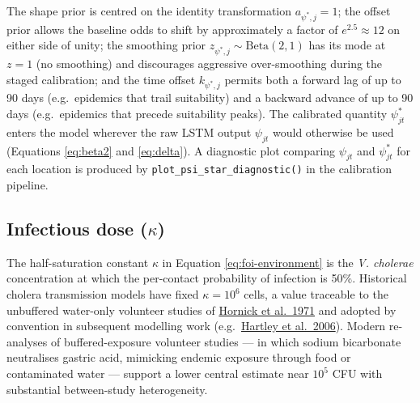 \documentclass[
]{book}
\begin{document}
The shape prior is centred on the identity transformation \(a_{\psi^{\ast},j} = 1\); the offset prior allows the baseline odds to shift by approximately a factor of \(e^{2.5} \approx 12\) on either side of unity; the smoothing prior \(z_{\psi^{\ast},j} \sim \text{Beta}(2, 1)\) has its mode at \(z = 1\) (no smoothing) and discourages aggressive over-smoothing during the staged calibration; and the time offset \(k_{\psi^{\ast},j}\) permits both a forward lag of up to 90 days (e.g.~epidemics that trail suitability) and a backward advance of up to 90 days (e.g.~epidemics that precede suitability peaks). The calibrated quantity \(\psi^{\ast}_{jt}\) enters the model wherever the raw LSTM output \(\psi_{jt}\) would otherwise be used (Equations \eqref{eq:beta2} and \eqref{eq:delta}). A diagnostic plot comparing \(\psi_{jt}\) and \(\psi^{\ast}_{jt}\) for each location is produced by \texttt{plot\_psi\_star\_diagnostic()} in the calibration pipeline.

\subsection{\texorpdfstring{Infectious dose (\(\kappa\))}{Infectious dose (\textbackslash kappa)}}\label{infectious-dose-kappa}

The half-saturation constant \(\kappa\) in Equation \eqref{eq:foi-environment} is the \emph{V. cholerae} concentration at which the per-contact probability of infection is 50\%. Historical cholera transmission models have fixed \(\kappa = 10^6\) cells, a value traceable to the unbuffered water-only volunteer studies of \href{https://pubmed.ncbi.nlm.nih.gov/5286453/}{Hornick et al.~1971} and adopted by convention in subsequent modelling work (e.g.~\href{https://journals.plos.org/plosmedicine/article?id=10.1371/journal.pmed.0030007}{Hartley et al.~2006}). Modern re-analyses of buffered-exposure volunteer studies --- in which sodium bicarbonate neutralises gastric acid, mimicking endemic exposure through food or contaminated water --- support a lower central estimate near \(10^5\) CFU with substantial between-study heterogeneity.
\end{document}
